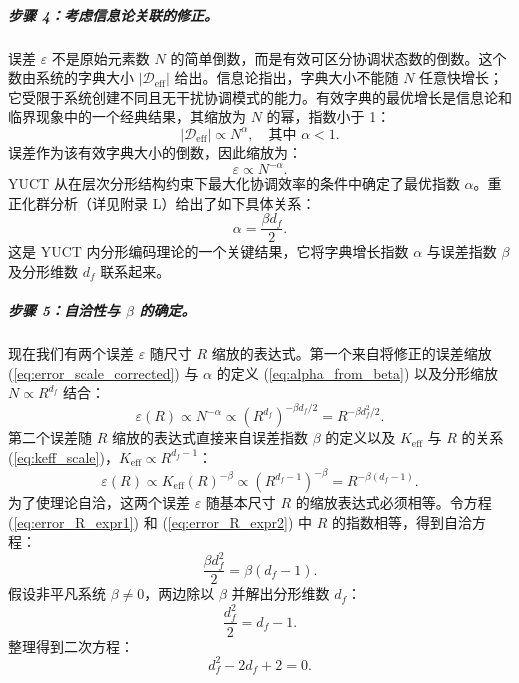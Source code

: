\documentclass[12pt,a4paper]{article}
\theoremstyle{remark}
\newcommand{\Ke}{K_{\mathrm{eff}}}
\begin{document}
	\subparagraph*{步骤 4：考虑信息论关联的修正。}
	误差 \(\varepsilon\) 不是原始元素数 \(N\) 的简单倒数，而是有效可区分协调状态数的倒数。这个数由系统的字典大小 \(|\mathcal{D}_{\text{eff}}|\) 给出。信息论指出，字典大小不能随 \(N\) 任意快增长；它受限于系统创建不同且无干扰协调模式的能力。有效字典的最优增长是信息论和临界现象中的一个经典结果，其缩放为 \(N\) 的幂，指数小于 1：
	\begin{equation}
		|\mathcal{D}_{\text{eff}}| \propto N^{\alpha}, \quad \text{其中 } \alpha < 1.
		\label{eq:dict_scale}
	\end{equation}
	误差作为该有效字典大小的倒数，因此缩放为：
	\begin{equation}
		\varepsilon \propto N^{-\alpha}.
		\label{eq:error_scale_corrected}
	\end{equation}
	YUCT 从在层次分形结构约束下最大化协调效率的条件中确定了最优指数 \(\alpha\)。重正化群分析（详见附录 L）给出了如下具体关系：
	\begin{equation}
		\alpha = \frac{\beta d_f}{2}.
		\label{eq:alpha_from_beta}
	\end{equation}
	这是 YUCT 内分形编码理论的一个关键结果，它将字典增长指数 \(\alpha\) 与误差指数 \(\beta\) 及分形维数 \(d_f\) 联系起来。
	
	\subparagraph*{步骤 5：自洽性与 \(\beta\) 的确定。}
	现在我们有两个误差 \(\varepsilon\) 随尺寸 \(R\) 缩放的表达式。第一个来自将修正的误差缩放 (\ref{eq:error_scale_corrected}) 与 \(\alpha\) 的定义 (\ref{eq:alpha_from_beta}) 以及分形缩放 \(N \propto R^{d_f}\) 结合：
	\begin{equation}
		\varepsilon(R) \propto N^{-\alpha} \propto (R^{d_f})^{-\beta d_f/2} = R^{-\beta d_f^2 / 2}.
		\label{eq:error_R_expr1}
	\end{equation}
	第二个误差随 \(R\) 缩放的表达式直接来自误差指数 \(\beta\) 的定义以及 \(\Ke\) 与 \(R\) 的关系 (\ref{eq:keff_scale})，\(\Ke \propto R^{d_f-1}\)：
	\begin{equation}
		\varepsilon(R) \propto \Ke(R)^{-\beta} \propto (R^{d_f-1})^{-\beta} = R^{-\beta(d_f-1)}.
		\label{eq:error_R_expr2}
	\end{equation}
	为了使理论自洽，这两个误差 \(\varepsilon\) 随基本尺寸 \(R\) 的缩放表达式必须相等。令方程 (\ref{eq:error_R_expr1}) 和 (\ref{eq:error_R_expr2}) 中 \(R\) 的指数相等，得到自洽方程：
	\begin{equation}
		\frac{\beta d_f^2}{2} = \beta (d_f - 1).
		\label{eq:consistency}
	\end{equation}
	假设非平凡系统 \(\beta \neq 0\)，两边除以 \(\beta\) 并解出分形维数 \(d_f\)：
	\begin{equation}
		\frac{d_f^2}{2} = d_f - 1.
	\end{equation}
	整理得到二次方程：
	\begin{equation}
		d_f^2 - 2d_f + 2 = 0.
		\label{eq:quadratic}
	\end{equation}
	
\end{document}
